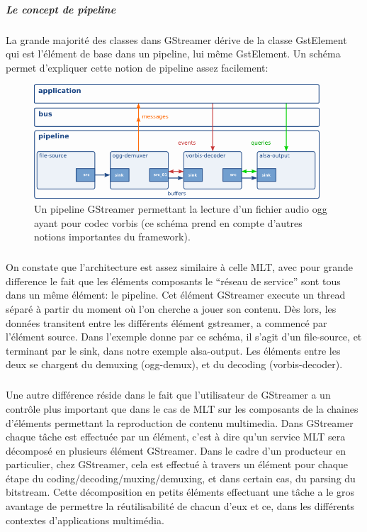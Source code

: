 \subparagraph{Le concept de pipeline}

\subparagraph{}

La grande majorité des classes dans GStreamer dérive de la classe
GstElement qui est l'élément de base dans un pipeline, lui même
GstElement. Un schéma permet d'expliquer cette notion de pipeline
assez facilement:

\newpage \begin{figure} [H]

  \begin{center}

    \includegraphics[width=0.95\textwidth]{images/gstpipeline}

  \end{center}

  \caption{Un pipeline GStreamer permettant la lecture d'un fichier
  audio ogg
    ayant pour codec vorbis (ce schéma prend en compte d'autres notions
    importantes du framework).}

  \label{Yes}

\end{figure}

\subparagraph{}

On constate que l'architecture est assez similaire à celle
MLT, avec pour grande difference le fait que les éléments
composants le ``réseau de service'' sont tous dans un même élément:
le pipeline. Cet élément GStreamer execute un thread séparé à
partir du moment où l'on cherche a jouer son contenu. Dès lors,
les données transitent entre les différents élément gstreamer, a
commencé par l'élément source. Dans l'exemple donne par ce schéma,
il s'agit d'un file-source, et terminant par le sink, dans notre exemple
alsa-output. Les éléments entre les deux se chargent du demuxing
(ogg-demux), et du decoding (vorbis-decoder).

\subparagraph{}

Une autre différence réside dans le fait que l'utilisateur de GStreamer
a un contrôle plus important que dans le cas de MLT sur
les composants de la chaines d'éléments permettant la reproduction de
contenu multimedia.  Dans GStreamer chaque tâche est effectuée par un
élément, c'est à dire qu'un service MLT sera décomposé
en plusieurs élément GStreamer. Dans le cadre d'un producteur en
particulier, chez GStreamer, cela est effectué à travers un élément
pour chaque étape du coding/decoding/muxing/demuxing, et dans certain
cas, du parsing du bitstream. Cette décomposition en petits éléments
effectuant une tâche a le gros avantage de permettre la réutilisabilité
de chacun d'eux et ce, dans les différents  contextes d'applications
multimédia.

